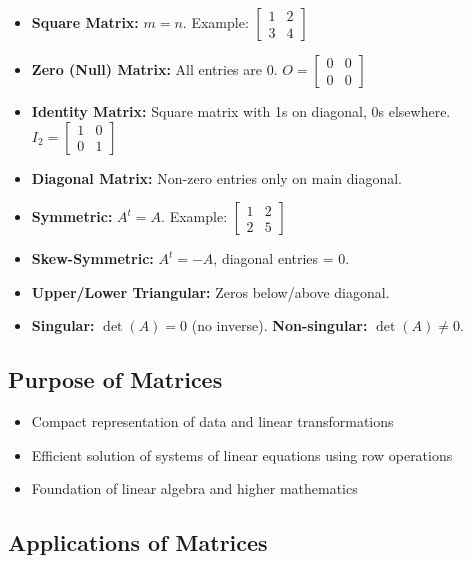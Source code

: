 \documentclass[12pt]{article}
\newcommand{\mat}[1]{\begin{bmatrix}#1\end{bmatrix}}
\begin{document}
\begin{itemize}[leftmargin=16pt, itemsep=4pt]
  \item \textbf{Square Matrix:} $m = n$. Example: $\mat{1&2\\3&4}$
  \item \textbf{Zero (Null) Matrix:} All entries are 0. $O = \mat{0&0\\0&0}$
  \item \textbf{Identity Matrix:} Square matrix with 1s on diagonal, 0s elsewhere. $I_2 = \mat{1&0\\0&1}$
  \item \textbf{Diagonal Matrix:} Non-zero entries only on main diagonal.
  \item \textbf{Symmetric:} $A^t = A$. Example: $\mat{1&2\\2&5}$
  \item \textbf{Skew-Symmetric:} $A^t = -A$, diagonal entries = 0.
  \item \textbf{Upper/Lower Triangular:} Zeros below/above diagonal.
  \item \textbf{Singular:} $\det(A) = 0$ (no inverse). \textbf{Non-singular:} $\det(A) \neq 0$.
\end{itemize}

\subsection{Purpose of Matrices}

\begin{itemize}[leftmargin=16pt, itemsep=3pt]
  \item Compact representation of data and linear transformations
  \item Efficient solution of systems of linear equations using row operations
  \item Foundation of linear algebra and higher mathematics
\end{itemize}

\subsection{Applications of Matrices}
\end{document}
